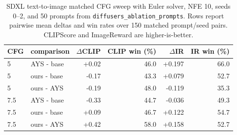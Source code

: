 \begin{table}[t]
  \centering
  \caption{SDXL text-to-image matched CFG sweep with Euler solver,
  NFE 10, seeds 0--2, and 50 prompts from
  \texttt{diffusers\_ablation\_prompts}. Rows report pairwise mean
  deltas and win rates over 150 matched prompt/seed pairs. CLIPScore
  and ImageReward are higher-is-better.}
  \label{tab:sdxl-euler-nfe10-cfg-sweep-pairwise}
  \begin{tabular}{llrrrr}
    \toprule
    CFG & comparison & $\Delta$CLIP & CLIP win (\%) & $\Delta$IR & IR win (\%) \\
    \midrule
    5 & AYS - base & +0.02 & 46.0 & +0.197 & 66.0 \\
    5 & ours - base & -0.17 & 43.3 & +0.079 & 52.7 \\
    5 & ours - AYS & -0.19 & 48.0 & -0.119 & 35.3 \\
    7.5 & AYS - base & -0.33 & 44.7 & -0.036 & 49.3 \\
    7.5 & ours - base & +0.09 & 46.7 & +0.122 & 54.7 \\
    7.5 & ours - AYS & +0.42 & 58.0 & +0.158 & 52.7 \\
    \bottomrule
  \end{tabular}
\end{table}

